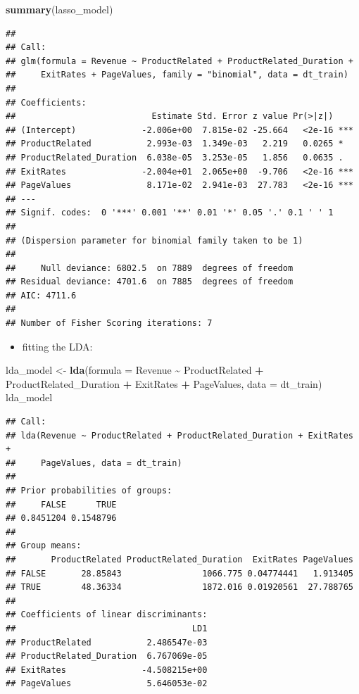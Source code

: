 \documentclass[
]{article}
\newenvironment{Shaded}{\begin{snugshade}}{\end{snugshade}}
\newcommand{\AttributeTok}[1]{\textcolor[rgb]{0.13,0.29,0.53}{#1}}
\newcommand{\FunctionTok}[1]{\textcolor[rgb]{0.13,0.29,0.53}{\textbf{#1}}}
\newcommand{\NormalTok}[1]{#1}
\newcommand{\OtherTok}[1]{\textcolor[rgb]{0.56,0.35,0.01}{#1}}
\newcommand{\SpecialCharTok}[1]{\textcolor[rgb]{0.81,0.36,0.00}{\textbf{#1}}}
\providecommand{\tightlist}{%
  \setlength{\itemsep}{0pt}\setlength{\parskip}{0pt}}
\begin{document}
\begin{Shaded}
\begin{Highlighting}[]
\FunctionTok{summary}\NormalTok{(lasso\_model)}
\end{Highlighting}
\end{Shaded}

\begin{verbatim}
## 
## Call:
## glm(formula = Revenue ~ ProductRelated + ProductRelated_Duration + 
##     ExitRates + PageValues, family = "binomial", data = dt_train)
## 
## Coefficients:
##                           Estimate Std. Error z value Pr(>|z|)    
## (Intercept)             -2.006e+00  7.815e-02 -25.664   <2e-16 ***
## ProductRelated           2.993e-03  1.349e-03   2.219   0.0265 *  
## ProductRelated_Duration  6.038e-05  3.253e-05   1.856   0.0635 .  
## ExitRates               -2.004e+01  2.065e+00  -9.706   <2e-16 ***
## PageValues               8.171e-02  2.941e-03  27.783   <2e-16 ***
## ---
## Signif. codes:  0 '***' 0.001 '**' 0.01 '*' 0.05 '.' 0.1 ' ' 1
## 
## (Dispersion parameter for binomial family taken to be 1)
## 
##     Null deviance: 6802.5  on 7889  degrees of freedom
## Residual deviance: 4701.6  on 7885  degrees of freedom
## AIC: 4711.6
## 
## Number of Fisher Scoring iterations: 7
\end{verbatim}

\begin{itemize}
\tightlist
\item
  fitting the LDA:
\end{itemize}

\begin{Shaded}
\begin{Highlighting}[]
\NormalTok{lda\_model }\OtherTok{\textless{}{-}} \FunctionTok{lda}\NormalTok{(}\AttributeTok{formula =}\NormalTok{ Revenue }\SpecialCharTok{\textasciitilde{}}\NormalTok{ ProductRelated }\SpecialCharTok{+}\NormalTok{ ProductRelated\_Duration }\SpecialCharTok{+}\NormalTok{ ExitRates }\SpecialCharTok{+}\NormalTok{ PageValues, }\AttributeTok{data =}\NormalTok{ dt\_train)}
\NormalTok{lda\_model}
\end{Highlighting}
\end{Shaded}

\begin{verbatim}
## Call:
## lda(Revenue ~ ProductRelated + ProductRelated_Duration + ExitRates + 
##     PageValues, data = dt_train)
## 
## Prior probabilities of groups:
##     FALSE      TRUE 
## 0.8451204 0.1548796 
## 
## Group means:
##       ProductRelated ProductRelated_Duration  ExitRates PageValues
## FALSE       28.85843                1066.775 0.04774441   1.913405
## TRUE        48.36334                1872.016 0.01920561  27.788765
## 
## Coefficients of linear discriminants:
##                                   LD1
## ProductRelated           2.486547e-03
## ProductRelated_Duration  6.767069e-05
## ExitRates               -4.508215e+00
## PageValues               5.646053e-02
\end{verbatim}
\end{document}
